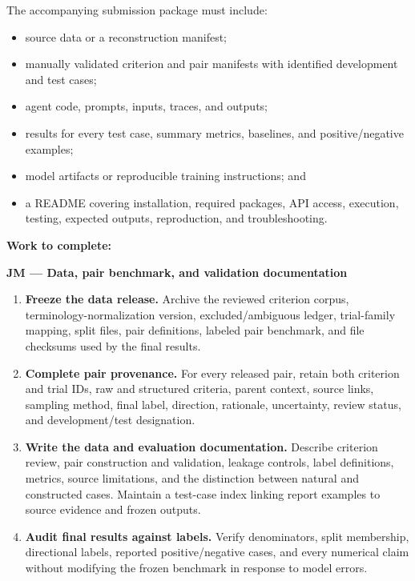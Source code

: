 \documentclass[10pt]{article}
\begin{document}
The accompanying submission package must include:
\begin{itemize}
\item source data or a reconstruction manifest;
\item manually validated criterion and pair manifests with identified development and test cases;
\item agent code, prompts, inputs, traces, and outputs;
\item results for every test case, summary metrics, baselines, and positive/negative examples;
\item model artifacts or reproducible training instructions; and
\item a README covering installation, required packages, API access, execution, testing, expected outputs, reproduction, and troubleshooting.
\end{itemize}

\textbf{Work to complete:}

\textbf{JM --- Data, pair benchmark, and validation documentation}
\begin{enumerate}
\item \textbf{Freeze the data release.} Archive the reviewed criterion corpus, terminology-normalization version, excluded/ambiguous ledger, trial-family mapping, split files, pair definitions, labeled pair benchmark, and file checksums used by the final results.
\item \textbf{Complete pair provenance.} For every released pair, retain both criterion and trial IDs, raw and structured criteria, parent context, source links, sampling method, final label, direction, rationale, uncertainty, review status, and development/test designation.
\item \textbf{Write the data and evaluation documentation.} Describe criterion review, pair construction and validation, leakage controls, label definitions, metrics, source limitations, and the distinction between natural and constructed cases. Maintain a test-case index linking report examples to source evidence and frozen outputs.
\item \textbf{Audit final results against labels.} Verify denominators, split membership, directional labels, reported positive/negative cases, and every numerical claim without modifying the frozen benchmark in response to model errors.
\end{enumerate}
\end{document}
